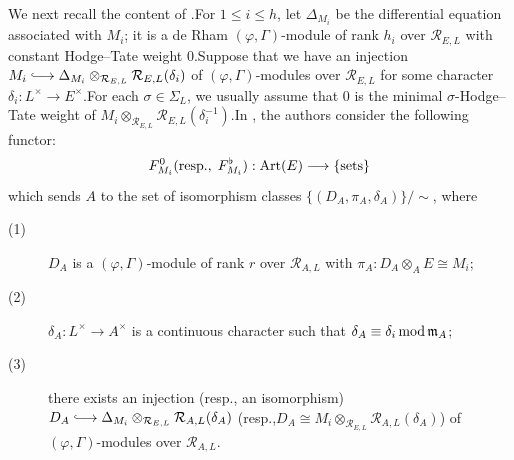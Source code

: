 \documentclass[10pt]{article}
\newcommand{\hooklongrightarrow}{\lhook\joinrel\longrightarrow}
\renewcommand{\mod}{{\rm\,mod\,}}
\newcommand{\Art}{{\rm Art}}
\newcommand{\cR}{\mathcal R}
\begin{document}
We next recall the content of \cite[Section 4.1.1]{Ding2021}.\;For $1\leq i\leq h$, let $\Delta_{M_i}$ be the differential equation associated with $M_i$; it is a de Rham $(\varphi,\Gamma)$-module of rank $h_i$ over $\cR_{E,L}$ with constant Hodge--Tate weight $0$.\;Suppose that we have an injection $M_i\hooklongrightarrow \Delta_{M_i}\otimes_{\cR_{E,L}}\cR_{E,L}(\delta_i)$ of $(\varphi,\Gamma)$-modules over $\cR_{E,L}$ for some character $\delta_i:L^\times\rightarrow E^\times$.\;For each $\sigma\in \Sigma_L$, we usually assume that $0$ is the minimal $\sigma$-Hodge--Tate weight of $M_i\otimes_{\cR_{E,L}}\cR_{E,L}(\delta^{-1}_i)$.\;In \cite[Sections 4.1.1 \& 4.1.2]{Ding2021}, the authors consider the following functor:
\[F_{M_{i}}^0 (\text{resp.},\;F_{M_{i}}^{\flat}):\Art(E)\longrightarrow \{\text{sets}\}\]
which sends $A$ to the set of isomorphism classes $\{(D_A,\pi_A,\delta_A)\}/\sim$, where
\begin{description}
	\item[(1)] $D_A$ is a $(\varphi,\Gamma)$-module of rank $r$ over $\cR_{A,L}$ with $\pi_A:D_A\otimes_AE\cong M_i$;
	\item[(2)] ${\delta}_{A}:L^\times\rightarrow A^\times$ is a continuous character such that ${\delta}_{A}\equiv {\delta}_i\mod \mathfrak{m}_A$;
	\item[(3)] there exists an injection (resp., an isomorphism) $D_A\hooklongrightarrow \Delta_{M_i}\otimes_{\cR_{E,L}}\cR_{A,L}({\delta}_{A})$ (resp.,\;$D_A\cong M_i\otimes_{\cR_{E,L}}\cR_{A,L}({\delta}_{A})$) of $(\varphi,\Gamma)$-modules over $\cR_{A,L}$.
\end{description}
\end{document}
